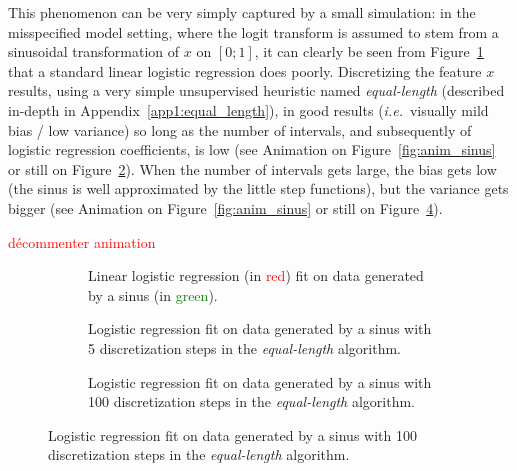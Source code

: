 This phenomenon can be very simply captured by a small simulation: in the misspecified model setting, where the logit transform is assumed to stem from a sinusoidal transformation of $x$ on $[0;1]$, it can clearly be seen from Figure~\ref{fig:sinus_lin} that a standard linear logistic regression does poorly. Discretizing the feature $x$ results, using a very simple unsupervised heuristic named \textit{equal-length} (described in-depth in Appendix~\ref{app1:equal_length}), in good results (\textit{i.e.}\ visually mild bias / low variance) so long as the number of intervals, and subsequently of logistic regression coefficients, is low (see Animation on Figure~\ref{fig:anim_sinus} or still on Figure~\ref{fig:sinus_deb}). When the number of intervals gets large, the bias gets low (the sinus is well approximated by the little step functions), but the variance gets bigger (see Animation on Figure~\ref{fig:anim_sinus} or still on Figure~\ref{fig:sinus_fin}).


\textcolor{red}{décommenter animation}


\begin{figure}[!ht]
\vspace*{-1cm}
\begin{subfigure}[t]{\textwidth}
\resizebox{\textwidth}{7cm}{}
\vspace*{-1cm}
\caption{\label{fig:sinus_lin} Linear logistic regression (in \textcolor{red}{red}) fit on data generated by a sinus (in \textcolor{green}{green}).}
\end{subfigure}
\vspace*{-1cm}
\begin{subfigure}[t]{\textwidth}
\resizebox{\textwidth}{7cm}{}
\vspace*{-1cm}
\caption{\label{fig:sinus_deb} Logistic regression fit on data generated by a sinus with 5 discretization steps in the \textit{equal-length} algorithm.}
\end{subfigure}
\vspace*{-1cm}
\begin{subfigure}[t]{\textwidth}
\resizebox{\textwidth}{7cm}{}
\caption{\label{fig:sinus_fin} Logistic regression fit on data generated by a sinus with 100 discretization steps in the \textit{equal-length} algorithm.}
\end{subfigure}
\end{figure}
 
